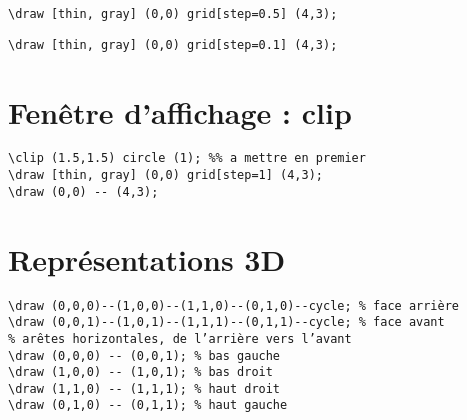 
\begin{verbatim}
\draw [thin, gray] (0,0) grid[step=0.5] (4,3);
\end{verbatim}


\begin{verbatim}
\draw [thin, gray] (0,0) grid[step=0.1] (4,3);
\end{verbatim}








\newpage
\section{Fenêtre d’affichage : clip}

\begin{verbatim}
\clip (1.5,1.5) circle (1); %% a mettre en premier
\draw [thin, gray] (0,0) grid[step=1] (4,3);
\draw (0,0) -- (4,3);
\end{verbatim}




\newpage
\section{Représentations 3D}

\begin{verbatim}
\draw (0,0,0)--(1,0,0)--(1,1,0)--(0,1,0)--cycle; % face arrière
\draw (0,0,1)--(1,0,1)--(1,1,1)--(0,1,1)--cycle; % face avant
% arêtes horizontales, de l’arrière vers l’avant
\draw (0,0,0) -- (0,0,1); % bas gauche
\draw (1,0,0) -- (1,0,1); % bas droit
\draw (1,1,0) -- (1,1,1); % haut droit
\draw (0,1,0) -- (0,1,1); % haut gauche
\end{verbatim}

